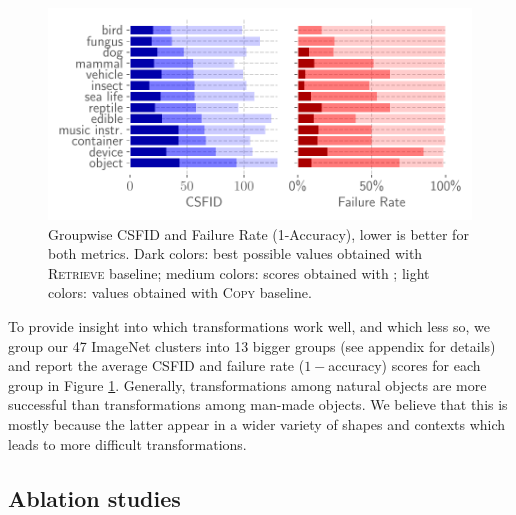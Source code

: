 \begin{figure}
    \centering
    \vspace{-1em}
    \includegraphics[width=\linewidth]{images/flexit/assets/classwise.pdf}
    \caption{Groupwise CSFID  and Failure Rate (1-Accuracy),  lower is better for both metrics. 
    Dark colors: best possible values obtained with  \textsc{Retrieve} baseline; medium colors: scores obtained with \ours; light colors: values obtained with  \textsc{Copy} baseline. 
    }
    
    \label{fig:classwise}
\end{figure}

To provide  insight into which transformations work well, and which less so, we group 
our 47 ImageNet clusters into 13 bigger groups (see appendix for details) and report 
the average CSFID and failure rate ($1 -$accuracy) scores for each group in Figure 
\ref{fig:classwise}.
Generally, transformations among  natural objects are more successful than
 transformations among man-made objects. We believe that this is mostly because the 
 latter appear in a wider variety of shapes and contexts which leads to more difficult 
 transformations.


\subsection{Ablation studies\label{ablations}}


